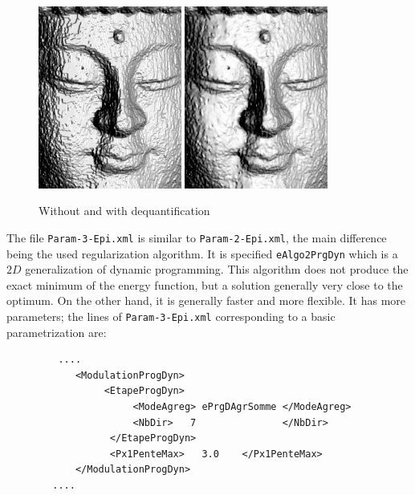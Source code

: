 \begin{figure}
\begin{center}
\includegraphics[height=60mm]{FIGS/Boudhas/ShadeQuant.jpg}
\includegraphics[height=60mm]{FIGS/Boudhas/ShadeDeQuant.jpg}
\caption{Without and with dequantification}
\label{FIG:DISP:REGUL}
\end{center}
\end{figure}


The file {\tt Param-3-Epi.xml} is similar to {\tt Param-2-Epi.xml}, the
main difference being the used regularization algorithm. It is specified 
{\tt eAlgo2PrgDyn} which is a $2D$ generalization of dynamic programming.
This algorithm does not produce the exact minimum of the energy function,
but a solution generally very close to the optimum. On the other hand,
it is generally faster and more flexible. It has more parameters;
the lines of {\tt Param-3-Epi.xml} corresponding to a basic
parametrization are:

{\scriptsize
\begin{verbatim}
         ....
            <ModulationProgDyn>
                 <EtapeProgDyn>
                      <ModeAgreg> ePrgDAgrSomme </ModeAgreg>
                      <NbDir>   7               </NbDir>
                  </EtapeProgDyn>
                  <Px1PenteMax>   3.0    </Px1PenteMax>
            </ModulationProgDyn>
        ....

\end{verbatim}
}

